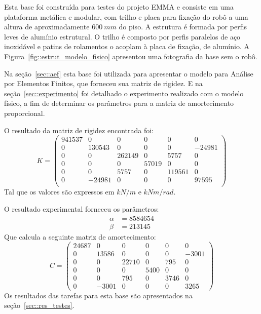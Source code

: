 Esta base foi construída para testes do projeto EMMA e consiste em uma
plataforma metálica e modular, com trilho e placa para fixação do robô a uma
altura de aproximadamente $600~mm$ do piso.
A estrutura é formada por perfis leves de alumínio estrutural. O trilho é
composto por perfis paralelos de aço inoxidável e patins de rolamentos o acoplam
à placa de fixação, de alumínio. A Figura~\ref{fig::estrut_modelo_fisico}
apresentou uma fotografia da base sem o robô.

Na seção~\ref{sec::aef} esta base foi utilizada para apresentar o modelo para
Análise por Elementos Finitos, que forneceu sua matriz de rigidez. E na
seção~\ref{sec::experimento} foi detalhado o experimento realizado com o modelo
físico, a fim de determinar os parâmetros para a matriz de amortecimento
proporcional.

O resultado da matriz de rigidez encontrada foi:
%
\begin{equation*}
	K =
\begin{pmatrix}
941537	&	0	&	0	&	0	&	0	&	0 \\
0	&	130543	&	0	&	0	&	0	&	-24981 \\
0	&	0	&	262149	&	0	&	5757	&	0 \\
0	&	0	&	0	&	57019	&	0	&	0 \\
0	&	0	&	5757	&	0	&	119561	&	0 \\
0	&	-24981	&	0	&	0	&	0	&	97595 \\
\end{pmatrix}
\end{equation*}
%
Tal que os valores são expressos em $kN/m$ e $kNm/rad$. 

O resultado experimental forneceu os parâmetros:
%
\begin{align*}
	\alpha &= 8584654 \\
	\beta &= 213145
\end{align*} 
%
Que calcula a seguinte matriz de amortecimento:
%
\begin{equation*}
	C =
\begin{pmatrix}
24687 &	0 &	0 &	0 &	0 &	0 \\
0 &	13586 &	0 &	0 &	0 &	-3001 \\
0 &	0 &	22710 &	0 &	795 &	0 \\
0 &	0 &	0 &	5400 &	0 &	0 \\
0 &	0 &	795 & 0 & 3746 & 0 \\
0 &	-3001 &	0 &	0 &	0 &	3265
\end{pmatrix}
\end{equation*}
%
Os resultados das tarefas para esta base são apresentados na
seção~\ref{sec::res_testes}.


